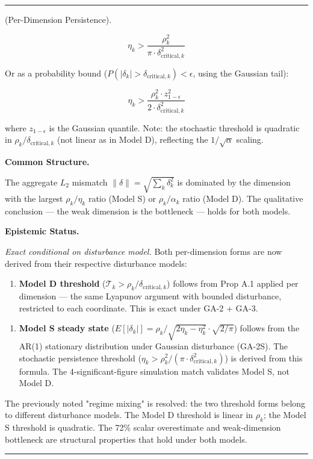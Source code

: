 \documentclass[11pt,oneside]{article}
\newcounter{claim}[section]
\renewcommand{\theclaim}{\thesection.\arabic{claim}}
\newenvironment{segment}[2]{%
  \refstepcounter{claim}%
  \bigskip\noindent\hrule\smallskip
  \noindent{\bfseries #1~\theclaim}\enskip(#2).\par\smallskip
  \noindent\ignorespaces
}{%
  \par\smallskip\noindent\hrule\bigskip
}
\newenvironment{theorem}[1][]{\begin{segment}{Theorem}{#1}}{\end{segment}}
\begin{document}
\begin{theorem}[Per-Dimension Persistence]
$$\eta_k > \frac{\rho_k^2}{\pi \cdot \delta_{\text{critical},k}^2}$$

Or as a probability bound ($P(|\delta_k| > \delta_{\text{critical},k}) < \epsilon$, using the Gaussian tail):

$$\eta_k > \frac{\rho_k^2 \cdot z_{1-\epsilon}^2}{2 \cdot \delta_{\text{critical},k}^2}$$

where $z_{1-\epsilon}$ is the Gaussian quantile. Note: the stochastic threshold is quadratic in $\rho_k/\delta_{\text{critical},k}$ (not linear as in Model D), reflecting the $1/\sqrt{\alpha}$ scaling.


\medskip\noindent\textbf{Common Structure.}


The aggregate $L_2$ mismatch $\lVert\delta\rVert = \sqrt{\sum_k \delta_k^2}$ is dominated by the dimension with the largest $\rho_k / \eta_k$ ratio (Model S) or $\rho_k / \alpha_k$ ratio (Model D). The qualitative conclusion — the weak dimension is the bottleneck — holds for both models.


\medskip\noindent\textbf{Epistemic Status.}


\textit{Exact conditional on disturbance model.} Both per-dimension forms are now derived from their respective disturbance models:

\begin{enumerate}
  \item \textbf{Model D threshold} ($\mathcal{T}_k > \rho_k/\delta_{\text{critical},k}$) follows from Prop A.1 applied per dimension — the same Lyapunov argument with bounded disturbance, restricted to each coordinate. This is exact under GA-2 + GA-3.
\end{enumerate}


\begin{enumerate}
  \item \textbf{Model S steady state} ($E[|\delta_k|] = \rho_k/\sqrt{2\eta_k - \eta_k^2} \cdot \sqrt{2/\pi}$) follows from the AR(1) stationary distribution under Gaussian disturbance (GA-2S). The stochastic persistence threshold ($\eta_k > \rho_k^2/(\pi \cdot \delta_{\text{critical},k}^2)$) is derived from this formula. The 4-significant-figure simulation match validates Model S, not Model D.
\end{enumerate}


The previously noted "regime mixing" is resolved: the two threshold forms belong to different disturbance models. The Model D threshold is linear in $\rho_k$; the Model S threshold is quadratic. The 72\% scalar overestimate and weak-dimension bottleneck are structural properties that hold under both models.



\end{theorem}
\end{document}
